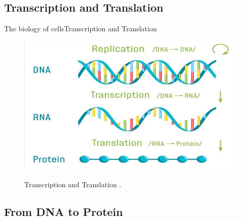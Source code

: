 \documentclass[10pt]{beamer}
\begin{document}
{%
\subsection{Transcription and Translation}

\begin{frame}{The biology of cells}{Transcription and Translation}
\begin{figure}[]
 \centering
    \includegraphics[width=\textwidth,height=0.6\textheight,keepaspectratio]{img/introduction/bio9.jpg}
    \label{img:mot2}
    \caption{Transcription and Translation \cite{dnacromosome2020}.}
\end{figure}
\end{frame}

\subsection{From DNA to Protein}

}
\end{document}

